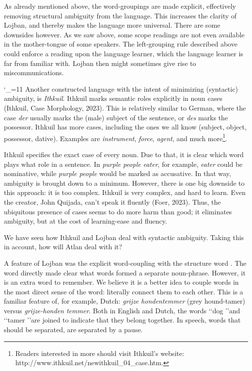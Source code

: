 As already mentioned above, the word-groupings are made explicit, effectively removing structural ambiguity from the language. This increases the clarity of Lojban, and thereby makes the language more universal. There are some downsides however. As we saw above, some scope readings are not even available in the mother-tongue of some speakers. The left-grouping rule described above could enforce a reading upon the language learner, which the language learner is far from familiar with. Lojban then might sometimes give rise to miscommunications. 

\catcode`\_=11
Another constructed language with the intent of minimizing (syntactic) ambiguity, is {\it Ithkuil}. Ithkuil marks semantic roles explicitly in noun cases (Ithkuil, Case Morphology, 2023). This is relatively similar to German, where the case {\it der} usually marks the (male) subject of the sentence, or {\it des} marks the possessor. Ithkuil has more cases, including the ones we all know (subject, object, possessor, dative). Examples are {\it instrument}, {\it force}, {\it agent}, and much more\footnote{Readers interested in more should visit Ithkuil's website: http://www.ithkuil.net/newithkuil_04_case.htm.}. 


Ithkuil specifies the exact case of every noun. Due to that, it is clear which word plays what role in a sentence. In {\it purple people eater}, for example, {\it eater} could be nominative, while {\it purple people} would be marked as accusative. In that way, ambiguity is brought down to a minimum. However, there is one big downside to this approach: it is too complex. Ithkuil is very complex, and hard to learn. Even the creator, John Quijada, can't speak it fluently (Foer, 2023). Thus, the ubiquitous presence of cases seems to do more harm than good; it eliminates ambiguity, but at the cost of learning-ease and fluency.

We have seen how Ithkuil and Lojban deal with syntactic ambiguity. Taking this in account, how will Atlan deal with it?

A feature of Lojban was the explicit word-coupling with the structure word \bo. The word directly made clear what words formed a separate noun-phrase. However, it is an extra word to remember. We believe it is a better idea to couple words in the most direct sense of the word: literally connect them to each other. This is a familiar feature of, for example, Dutch: {\it grijze hondentemmer} (grey hound-tamer) versus {\it grijze-honden temmer}. Both in English and Dutch, the words \lq\lq dog \rq\rq and \lq\lq tamer \rq\rq are joined to indicate that they belong together. In speech, words that should be separated, are separated by a pause. 

